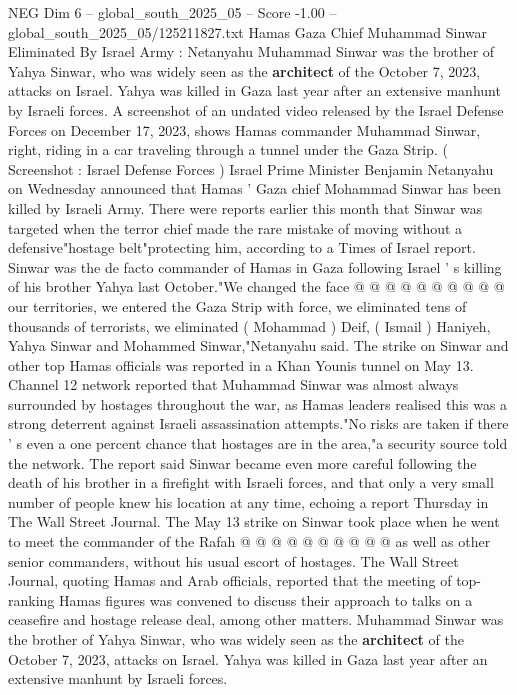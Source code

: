 \begin{textsample}{NEG Dim 6 – global\_south\_2025\_05 – Score -1.00 – global\_south\_2025\_05/125211827.txt}  \label{ex:f6_neg_387}
Hamas Gaza Chief Muhammad Sinwar Eliminated By Israel Army : Netanyahu Muhammad Sinwar was the brother of Yahya Sinwar, who was widely seen as the \textbf{architect} of the October 7, 2023, attacks on Israel.
Yahya was killed in Gaza last year after an extensive manhunt by Israeli forces.
A screenshot of an undated video released by the Israel Defense Forces on December 17, 2023, shows Hamas commander Muhammad Sinwar, right, riding in a car traveling through a tunnel under the Gaza Strip. ( Screenshot : Israel Defense Forces ) Israel Prime Minister Benjamin Netanyahu on Wednesday announced that Hamas ' Gaza chief Mohammad Sinwar has been killed by Israeli Army.
There were reports earlier this month that Sinwar was targeted when the terror chief made the rare mistake of moving without a defensive"hostage belt"protecting him, according to a Times of Israel report.
Sinwar was the de facto commander of Hamas in Gaza following Israel ' s killing of his brother Yahya last October."We changed the face @ @ @ @ @ @ @ @ @ @ our territories, we entered the Gaza Strip with force, we eliminated tens of thousands of terrorists, we eliminated ( Mohammad ) Deif, ( Ismail ) Haniyeh, Yahya Sinwar and Mohammed Sinwar,"Netanyahu said.
The strike on Sinwar and other top Hamas officials was reported in a Khan Younis tunnel on May 13.
Channel 12 network reported that Muhammad Sinwar was almost always surrounded by hostages throughout the war, as Hamas leaders realised this was a strong deterrent against Israeli assassination attempts."No risks are taken if there ' s even a one percent chance that hostages are in the area,"a security source told the network.
The report said Sinwar became even more careful following the death of his brother in a firefight with Israeli forces, and that only a very small number of people knew his location at any time, echoing a report Thursday in The Wall Street Journal.
The May 13 strike on Sinwar took place when he went to meet the commander of the Rafah @ @ @ @ @ @ @ @ @ @ as well as other senior commanders, without his usual escort of hostages.
The Wall Street Journal, quoting Hamas and Arab officials, reported that the meeting of top-ranking Hamas figures was convened to discuss their approach to talks on a ceasefire and hostage release deal, among other matters.
Muhammad Sinwar was the brother of Yahya Sinwar, who was widely seen as the \textbf{architect} of the October 7, 2023, attacks on Israel.
Yahya was killed in Gaza last year after an extensive manhunt by Israeli forces.

\end{textsample}
